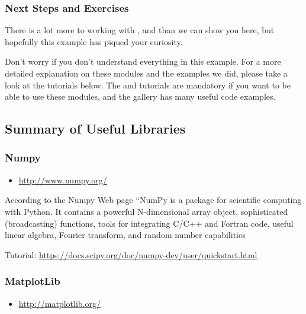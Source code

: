 \subsubsection{Next Steps and Exercises}
\label{\detokenize{lesson/prg/python_big_data:next-steps-and-exercises}}
There is a lot more to working with ,  and
 than we can show you here, but hopefully this example
has piqued your curiosity.

Don't worry if you don't understand
everything in this example. For a more detailed explanation on these
modules and the examples we did, please take a look at the tutorials
below. The  and  tutorials are mandatory if you
want to be able to use these modules, and the  gallery
has many useful code examples.


\subsection{Summary of Useful Libraries}
\label{\detokenize{lesson/prg/python_big_data:summary-of-useful-libraries}}

\subsubsection{Numpy}
\label{\detokenize{lesson/prg/python_big_data:id3}}\begin{itemize}
\item {} 
\url{http://www.numpy.org/}

\end{itemize}

According to the Numpy Web page ``NumPy is a package for scientific
computing with Python. It contains a powerful N-dimensional array
object, sophisticated (broadcasting) functions, tools for integrating
C/C++ and Fortran code, useful linear algebra, Fourier transform, and
random number capabilities

Tutorial: \url{https://docs.scipy.org/doc/numpy-dev/user/quickstart.html}


\subsubsection{MatplotLib}
\label{\detokenize{lesson/prg/python_big_data:id4}}\begin{itemize}
\item {} 
\url{http://matplotlib.org/}

\end{itemize}

